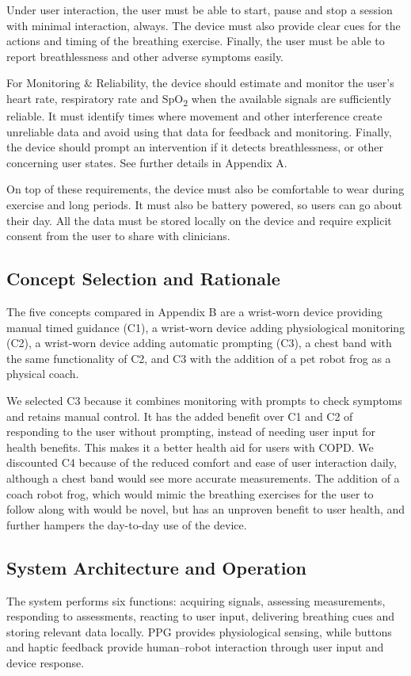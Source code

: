 Under user interaction, the user must be able to start, pause and stop a session with minimal interaction, always. The device must also provide clear cues for the actions and timing of the breathing exercise. Finally, the user must be able to report breathlessness and other adverse symptoms easily.

For Monitoring \& Reliability, the device should estimate and monitor the user's heart rate, respiratory rate and SpO\textsubscript{2} when the available signals are sufficiently reliable. It must identify times where movement and other interference create unreliable data and avoid using that data for feedback and monitoring. Finally, the device should prompt an intervention if it detects breathlessness, or other concerning user states. See further details in Appendix A.

On top of these requirements, the device must also be comfortable to wear during exercise and long periods. It must also be battery powered, so users can go about their day. All the data must be stored locally on the device and require explicit consent from the user to share with clinicians.

\subsection{Concept Selection and Rationale}
The five concepts compared in Appendix B are a wrist-worn device providing manual timed guidance (C1), a wrist-worn device adding physiological monitoring (C2), a wrist-worn device adding automatic prompting (C3), a chest band with the same functionality of C2, and C3 with the addition of a pet robot frog as a physical coach.

We selected C3 because it combines monitoring with prompts to check symptoms and retains manual control. It has the added benefit over C1 and C2 of responding to the user without prompting, instead of needing user input for health benefits. This makes it a better health aid for users with COPD. We discounted C4 because of the reduced comfort and ease of user interaction daily, although a chest band would see more accurate measurements. The addition of a coach robot frog, which would mimic the breathing exercises for the user to follow along with would be novel, but has an unproven benefit to user health, and further hampers the day-to-day use of the device.

\subsection{System Architecture and Operation}
The system performs six functions: acquiring signals, assessing measurements, responding to assessments, reacting to user input, delivering breathing cues and storing relevant data locally. PPG provides physiological sensing, while buttons and haptic feedback provide human--robot interaction through user input and device response.

